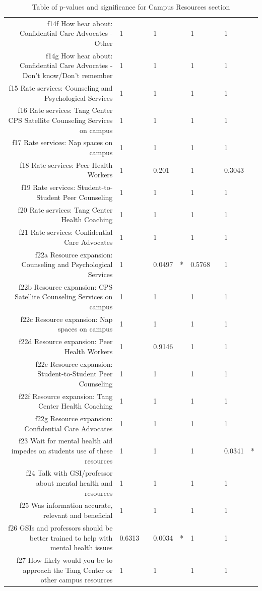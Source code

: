 \documentclass{article}\usepackage[]{graphicx}\usepackage[]{color}
\begin{document}
\begin{table}[ht]
{\begin{tabular}{rllllllll}
  f14f How hear about: Confidential Care Advocates - Other & 1 &   & 1 &   & 1 &   & 1 &   \\ 
  f14g How hear about: Confidential Care Advocates - Don't know/Don't remember & 1 &   & 1 &   & 1 &   & 1 &   \\ 
  f15 Rate services: Counseling and Psychological Services & 1 &   & 1 &   & 1 &   & 1 &   \\ 
  f16 Rate services: Tang Center CPS Satellite Counseling Services on campus & 1 &   & 1 &   & 1 &   & 1 &   \\ 
  f17 Rate services: Nap spaces on campus & 1 &   & 1 &   & 1 &   & 1 &   \\ 
  f18 Rate services: Peer Health Workers & 1 &   & 0.201 &   & 1 &   & 0.3043 &   \\ 
  f19 Rate services: Student-to-Student Peer Counseling & 1 &   & 1 &   & 1 &   & 1 &   \\ 
  f20 Rate services: Tang Center Health Coaching & 1 &   & 1 &   & 1 &   & 1 &   \\ 
  f21 Rate services: Confidential Care Advocates & 1 &   & 1 &   & 1 &   & 1 &   \\ 
  f22a Resource expansion: Counseling and Psychological Services & 1 &   & 0.0497 & * & 0.5768 &   & 1 &   \\ 
  f22b Resource expansion: CPS Satellite Counseling Services on campus & 1 &   & 1 &   & 1 &   & 1 &   \\ 
  f22c Resource expansion: Nap spaces on campus & 1 &   & 1 &   & 1 &   & 1 &   \\ 
  f22d Resource expansion: Peer Health Workers & 1 &   & 0.9146 &   & 1 &   & 1 &   \\ 
  f22e Resource expansion: Student-to-Student Peer Counseling & 1 &   & 1 &   & 1 &   & 1 &   \\ 
  f22f Resource expansion: Tang Center Health Coaching & 1 &   & 1 &   & 1 &   & 1 &   \\ 
  f22g Resource expansion: Confidential Care Advocates & 1 &   & 1 &   & 1 &   & 1 &   \\ 
  f23 Wait for mental health aid impedes on students use of these resources & 1 &   & 1 &   & 1 &   & 0.0341 & * \\ 
  f24 Talk with GSI/professor about mental health and resources & 1 &   & 1 &   & 1 &   & 1 &   \\ 
  f25 Was information accurate, relevant and beneficial & 1 &   & 1 &   & 1 &   & 1 &   \\ 
  f26 GSIs and professors should be better trained to help with mental health issues & 0.6313 &   & 0.0034 & * & 1 &   & 1 &   \\ 
  f27 How likely would you be to approach the Tang Center or other campus resources & 1 &   & 1 &   & 1 &   & 1 &   \\ 
   \hline
\end{tabular}
}
\caption{Table of p-values and significance for Campus Resources section} 
\end{table}
\end{document}
